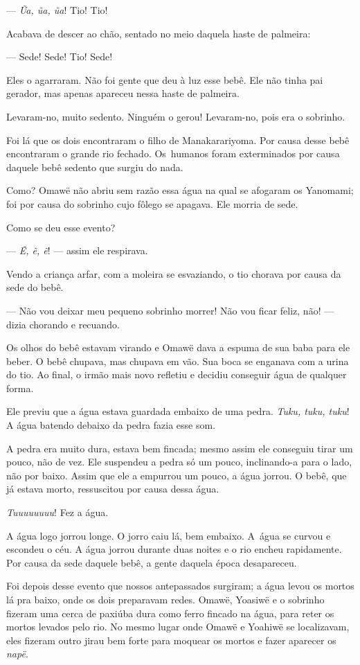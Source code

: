 --- \textit{Ũa, ũa, ũa}! Tio! Tio!

Acabava de descer ao chão, sentado no meio daquela haste de palmeira:

--- Sede! Sede! Tio! Sede!

Eles o agarraram. Não foi gente que deu à luz esse bebê. Ele não
 tinha pai gerador, mas apenas apareceu nessa haste de palmeira.

Levaram-no, muito sedento. Ninguém o gerou! Levaram-no, pois era o
sobrinho. 

Foi lá que os dois encontraram o filho de Manakarariyoma. Por causa
 desse bebê encontraram o grande rio fechado. Os~humanos foram
 exterminados por causa daquele bebê sedento que surgiu do nada. 

Como? Omawë não abriu sem razão essa água na qual se afogaram os
Yanomami; foi por causa do sobrinho cujo fôlego se apagava. Ele morria de
sede. 

Como se deu esse evento?

--- \textit{Ẽ, ẽ, ẽ}! --- assim ele respirava. 

Vendo a criança arfar, com a moleira se esvaziando, o tio chorava por
causa da sede do bebê. 

--- Não vou deixar meu pequeno sobrinho morrer! Não vou ficar feliz,
não! --- dizia chorando e recuando. 

Os olhos do bebê estavam virando e Omawë dava a espuma de sua baba para
ele beber. O bebê chupava, mas chupava em vão. Sua boca se enganava com a
urina do tio. Ao final, o irmão mais novo refletiu e decidiu conseguir água de qualquer forma. 

Ele previu que a água estava guardada embaixo de uma pedra. \textit{Tuku, tuku, tuku}! A água batendo debaixo da pedra fazia esse som. 

A pedra era muito dura, estava bem fincada; mesmo assim ele conseguiu
tirar um pouco, não de vez. Ele suspendeu a pedra só um pouco,
inclinando-a para o lado, não por baixo. Assim que ele a empurrou um pouco, a
água jorrou. O bebê, que já estava morto, ressuscitou por causa dessa
água.

\textit{Tuuuuuuuu}! Fez a água. 

A água logo jorrou longe. O jorro caiu lá, bem embaixo. A~água se
curvou e escondeu o céu. A água jorrou durante duas noites e o rio
encheu rapidamente. Por causa da sede daquele bebê, a gente daquela
época desapareceu. 

Foi depois desse evento que nossos antepassados surgiram; a água levou
os mortos lá pra baixo, onde os dois preparavam redes. Omawë, Yoasiwë e o
sobrinho fizeram uma cerca de paxiúba dura como ferro fincado na água,
para reter os mortos levados pelo rio. No mesmo lugar onde Omawë e
Yoahiwë se localizavam, eles fizeram outro jirau bem forte para moquear
os mortos e fazer aparecer os \textit{napë}. 

